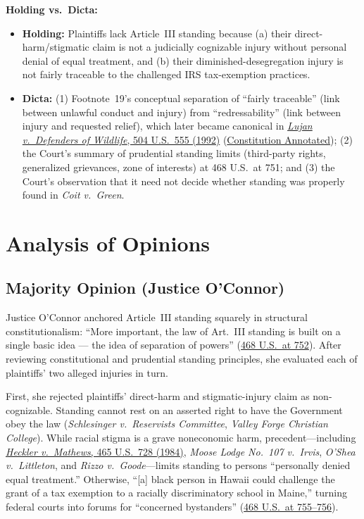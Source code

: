 \documentclass[12pt]{article}
\begin{document}
\textbf{Holding vs.\ Dicta:}
\begin{itemize}
  \item \textbf{Holding:} Plaintiffs lack Article~III standing because (a) their direct-harm/stigmatic claim is not a judicially cognizable injury without personal denial of equal treatment, and (b) their diminished-desegregation injury is not fairly traceable to the challenged IRS tax-exemption practices.
  \item \textbf{Dicta:} (1) Footnote~19's conceptual separation of ``fairly traceable'' (link between unlawful conduct and injury) from ``redressability'' (link between injury and requested relief), which later became canonical in \href{https://supreme.justia.com/cases/federal/us/504/555/}{\textit{Lujan v.\ Defenders of Wildlife}, 504 U.S.\ 555 (1992)} (\href{https://constitution.congress.gov/browse/essay/artIII-S2-C1-6-4-1/ALDE_00012995/}{Constitution Annotated}); (2) the Court's summary of prudential standing limits (third-party rights, generalized grievances, zone of interests) at 468 U.S.\ at 751; and (3) the Court's observation that it need not decide whether standing was properly found in \textit{Coit v.\ Green}.
\end{itemize}

\section{Analysis of Opinions}

\subsection{Majority Opinion (Justice O'Connor)}
Justice O'Connor anchored Article~III standing squarely in structural constitutionalism: ``More important, the law of Art.\ III standing is built on a single basic idea --- the idea of separation of powers'' (\href{https://supreme.justia.com/cases/federal/us/468/737/}{468 U.S.\ at 752}). After reviewing constitutional and prudential standing principles, she evaluated each of plaintiffs' two alleged injuries in turn.

First, she rejected plaintiffs' direct-harm and stigmatic-injury claim as non-cognizable. Standing cannot rest on an asserted right to have the Government obey the law (\textit{Schlesinger v.\ Reservists Committee}, \textit{Valley Forge Christian College}). While racial stigma is a grave noneconomic harm, precedent---including \href{https://supreme.justia.com/cases/federal/us/465/728/}{\textit{Heckler v.\ Mathews}, 465 U.S.\ 728 (1984)}, \textit{Moose Lodge No.\ 107 v.\ Irvis}, \textit{O'Shea v.\ Littleton}, and \textit{Rizzo v.\ Goode}---limits standing to persons ``personally denied equal treatment.'' Otherwise, ``[a] black person in Hawaii could challenge the grant of a tax exemption to a racially discriminatory school in Maine,'' turning federal courts into forums for ``concerned bystanders'' (\href{https://supreme.justia.com/cases/federal/us/468/737/}{468 U.S.\ at 755--756}).
\end{document}
